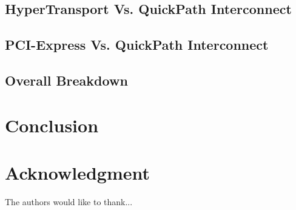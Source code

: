 \documentclass[conference]{IEEEtran}
\begin{document}
\subsection{HyperTransport Vs. QuickPath Interconnect}


\subsection{PCI-Express Vs. QuickPath Interconnect}

\subsection{Overall Breakdown}

\section{Conclusion}

\section*{Acknowledgment}
The authors would like to thank...



\end{document}

